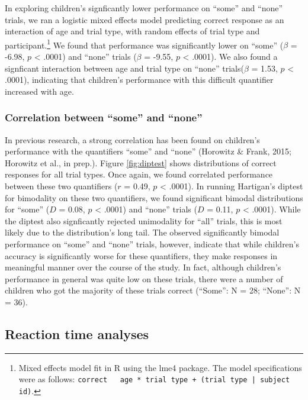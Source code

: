 \documentclass[10pt, letterpaper]{article}
\begin{document}
In exploring children's signficantly lower performance on ``some'' and
``none'' trials, we ran a logistic mixed effects model predicting
correct response as an interaction of age and trial type, with random
effects of trial type and
participant.\footnote{Mixed effects model fit in R using the lme4 package. The model specifications were as follows: \texttt{correct ~ age * trial type + (trial type | subject id)}.}
We found that performance was significantly lower on ``some'' (\(\beta\)
= -6.98, \(p\) \textless{} .0001) and ``none'' trials (\(\beta\) =
-9.55, \(p\) \textless{} .0001). We also found a signficant interaction
between age and trial type on ``none'' trials(\(\beta\) = 1.53, \(p\)
\textless{} .0001), indicating that children's performance with this
difficult quantifier increased with age.

\subsubsection{Correlation between ``some'' and
``none''}\label{correlation-between-some-and-none}

In previous research, a strong correlation has been found on children's
performance with the quantifiers ``some'' and ``none'' (Horowitz \&
Frank, 2015; Horowitz et al., in prep.). Figure \ref{fig:diptest} shows
distributions of correct responses for all trial types. Once again, we
found correlated performance between these two quantifiers (\(r\) =
0.49, \(p\) \textless{} .0001). In running Hartigan's diptest for
bimodality on these two quantifiers, we found significant bimodal
distributions for ``some'' (\(D\) = 0.08, \(p\) \textless{} .0001) and
``none'' trials (\(D\) = 0.11, \(p\) \textless{} .0001). While the
diptest also signficantly rejected unimodality for ``all'' trials, this
is most likely due to the distribution's long tail. The observed
significantly bimodal performance on ``some'' and ``none'' trials,
however, indicate that while children's accuracy is significantly worse
for these quantifiers, they make responses in meaningful manner over the
course of the study. In fact, although children's performance in general
was quite low on these trials, there were a number of children who got
the majority of these trials correct (``Some'': N = 28; ``None'': N =
36).

\subsection{Reaction time analyses}\label{reaction-time-analyses}
\end{document}
